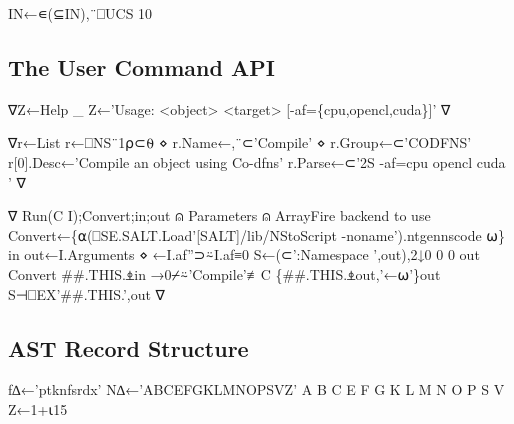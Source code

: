\documentclass{article}%
\begin{document}
\nwenddocs{}\endmoddef\nwstartdeflinemarkup{}\nwenddeflinemarkup
IN←∊(⊆IN),¨⎕UCS 10
\nwendcode{}\nwdocspar

\subsection{The User Command API}

\nwenddocs{}\endmoddef\nwstartdeflinemarkup{}\nwenddeflinemarkup
∇Z←Help _
 Z←'Usage: <object> <target> [-af=\{cpu,opencl,cuda\}]'
∇

∇r←List
 r←⎕NS¨1⍴⊂⍬ ⋄ r.Name←,¨⊂'Compile' ⋄ r.Group←⊂'CODFNS'
 r[0].Desc←'Compile an object using Co-dfns'
 r.Parse←⊂'2S -af=cpu opencl cuda '
∇

∇ Run(C I);Convert;in;out
⍝ Parameters
⍝              ArrayFire backend to use
 Convert←\{⍺(⎕SE.SALT.Load'[SALT]/lib/NStoScript -noname').ntgennscode ⍵\}
 in out←I.Arguments ⋄ ←I.af''⊃⍨I.af≡0
 S←(⊂':Namespace ',out),2↓0 0 0 out Convert ##.THIS.⍎in
 →0⌿⍨'Compile'≢C
 \{##.THIS.⍎out,'←⍵'\}out  S⊣⎕EX'##.THIS.',out
∇
\nwendcode{}\nwdocspar

\subsection{AST Record Structure}

\nwenddocs{}\endmoddef\nwstartdeflinemarkup{}\nwenddeflinemarkup
f∆←'ptknfsrdx'
N∆←'ABCEFGKLMNOPSVZ'
A B C E F G K L M N O P S V Z←1+⍳15
\nwendcode{}\nwdocspar
\end{document}
